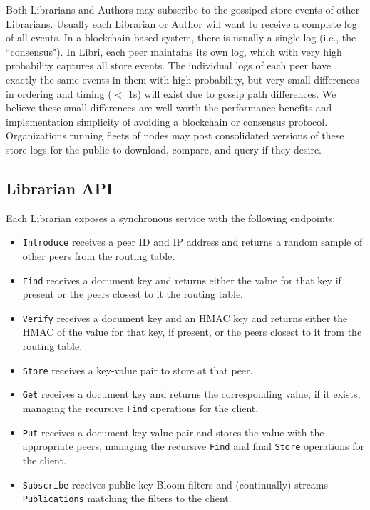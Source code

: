 \documentclass[10pt]{article}
\newcommand{\ttt}[1]{\texttt{#1}}
\begin{document}
Both Librarians and Authors may subscribe to the gossiped store events of other Librarians. Usually each Librarian or Author will want to receive a complete log of all events. In a blockchain-based system, there is usually a single log (i.e., the ``consensus"). In Libri, each peer maintains its own log, which with very high probability captures all store events. The individual logs of each peer have exactly the same events in them with high probability, but very small differences in ordering and timing ($<$ 1s) will exist due to gossip path differences. We believe these small differences are well worth the performance benefits and implementation simplicity of avoiding a blockchain or consensus protocol. Organizations running fleets of nodes may post consolidated versions of these store logs for the public to download, compare, and query if they desire.

\subsection{Librarian API}
\label{sec:API}
Each Librarian exposes a synchronous service with the following endpoints:
\begin{itemize}
	\item \ttt{Introduce} receives a peer ID and IP address and returns a random sample of other peers from the routing table.
	\item \ttt{Find} receives a document key and returns either the value for that key if present or the peers closest to it the routing table.
	\item \ttt{Verify} receives a document key and an HMAC key and returns either the HMAC of the value for that key, if present, or the peers closest to it from the routing table.
	\item \ttt{Store} receives a key-value pair to store at that peer.
	\item \ttt{Get} receives a document key and returns the corresponding value, if it exists, managing the recursive \texttt{Find} operations for the client.
	\item \ttt{Put} receives a document key-value pair and stores the value with the appropriate peers, managing the recursive \texttt{Find} and final \ttt{Store} operations for the client.
	\item \ttt{Subscribe} receives public key Bloom filters and (continually) streams \ttt{Publications} matching the filters to the client.
\end{itemize}
\end{document}
